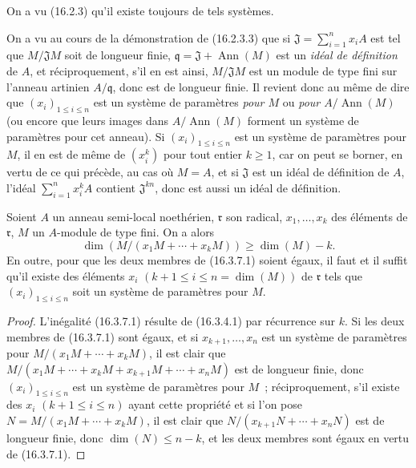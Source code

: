 On a vu (16.2.3) qu'il existe toujours de tels systèmes.

On a vu au cours de la démonstration de (16.2.3.3) que si
$\mathfrak{J}=\sum_{i=1}^n x_iA$ est tel que $M/\mathfrak{J}M$ soit de
longueur finie, $\mathfrak{q}=\mathfrak{J}+\operatorname{Ann}(M)$ est un
\emph{idéal de définition} de $A$, et réciproquement, s'il en est ainsi,
$M/\mathfrak{J}M$ est un module de type fini sur l'anneau artinien
$A/\mathfrak{q}$, donc est de longueur finie. Il revient donc au même de dire
que $(x_i)_{1\leq i\leq n}$ est un système de paramètres \emph{pour $M$} ou
\emph{pour $A/\operatorname{Ann}(M)$} (ou encore que leurs images dans
$A/\operatorname{Ann}(M)$ forment un système de paramètres pour cet anneau).
Si $(x_i)_{1\leq i\leq n}$ est un système de paramètres pour $M$, il en est de
même de $(x_i^k)$ pour tout entier $k\geq1$, car on peut se borner, en vertu de
ce qui précède, au cas où $M=A$, et si $\mathfrak{J}$ est un idéal de
définition de $A$, l'idéal $\sum_{i=1}^n x_i^kA$ contient
$\mathfrak{J}^{kn}$, donc est aussi un idéal de définition.

\begin{proposition}[16.3.7]
\label{0.16.3.7-fr}
Soient $A$ un anneau semi-local noethérien, $\mathfrak{r}$ son radical,
$x_1,\ldots,x_k$ des éléments de $\mathfrak{r}$, $M$ un $A$-module de type
fini. On a alors
\begin{equation}
\label{0.16.3.7.1-fr}
\tag{16.3.7.1}
  \dim(M/(x_1M+\cdots+x_kM))\geq\dim(M)-k.
\end{equation}
En outre, pour que les deux membres de (16.3.7.1) soient égaux, il faut et il
suffit qu'il existe des éléments $x_i$
$(k+1\leq i\leq n=\dim(M))$ de $\mathfrak{r}$ tels que
$(x_i)_{1\leq i\leq n}$ soit un système de paramètres pour $M$.
\end{proposition}

\begin{proof}
L'inégalité (16.3.7.1) résulte de (16.3.4.1) par récurrence sur $k$. Si les
deux membres de (16.3.7.1) sont égaux, et si $x_{k+1},\ldots,x_n$ est un
système de paramètres pour $M/(x_1M+\cdots+x_kM)$, il est clair que
$M/(x_1M+\cdots+x_kM+x_{k+1}M+\cdots+x_nM)$ est de longueur finie, donc
$(x_i)_{1\leq i\leq n}$ est un système de paramètres pour $M$~;
réciproquement, s'il existe des $x_i$ $(k+1\leq i\leq n)$ ayant cette
propriété et si l'on pose $N=M/(x_1M+\cdots+x_kM)$, il est clair que
$N/(x_{k+1}N+\cdots+x_nN)$ est de longueur finie, donc
$\dim(N)\leq n-k$, et les deux membres sont égaux en vertu de (16.3.7.1).
\end{proof}

